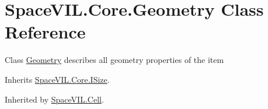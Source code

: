 \hypertarget{class_space_v_i_l_1_1_core_1_1_geometry}{}\section{Space\+V\+I\+L.\+Core.\+Geometry Class Reference}
\label{class_space_v_i_l_1_1_core_1_1_geometry}


Class \mbox{\hyperlink{class_space_v_i_l_1_1_core_1_1_geometry}{Geometry}} describes all geometry properties of the item  




Inherits \mbox{\hyperlink{interface_space_v_i_l_1_1_core_1_1_i_size}{Space\+V\+I\+L.\+Core.\+I\+Size}}.



Inherited by \mbox{\hyperlink{class_space_v_i_l_1_1_cell}{Space\+V\+I\+L.\+Cell}}.

